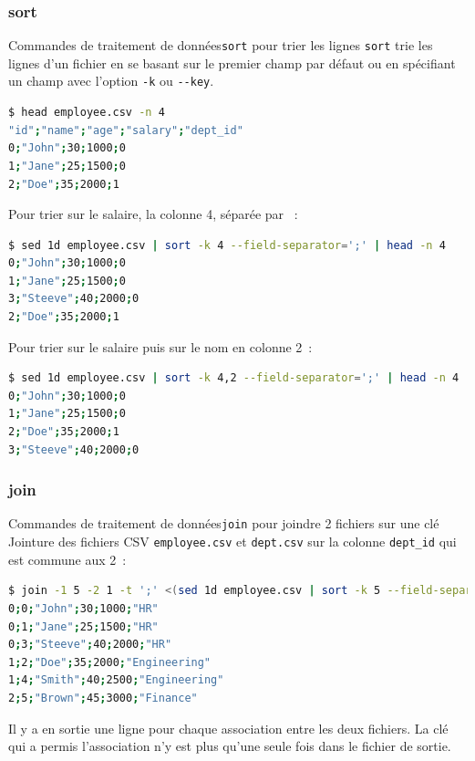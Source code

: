 \documentclass{beamer}
\begin{document}
    \subsubsection{sort}\label{subsubsec:sort}
    \begin{frame}[fragile]{Commandes de traitement de données}{\lstinline{sort} pour trier les lignes}
        \lstinline{sort} trie les lignes d'un fichier en se basant sur le premier champ par défaut ou en spécifiant un champ avec l'option \lstinline{-k} ou \lstinline{--key}.
        \begin{lstlisting}[language=bash,basicstyle=\tiny\ttfamily]
$ head employee.csv -n 4
"id";"name";"age";"salary";"dept_id"
0;"John";30;1000;0
1;"Jane";25;1500;0
2;"Doe";35;2000;1
        \end{lstlisting}
        Pour trier sur le salaire, la colonne 4, séparée par \textquote{;}~:
        \begin{lstlisting}[language=bash,basicstyle=\tiny\ttfamily]
$ sed 1d employee.csv | sort -k 4 --field-separator=';' | head -n 4
0;"John";30;1000;0
1;"Jane";25;1500;0
3;"Steeve";40;2000;0
2;"Doe";35;2000;1
        \end{lstlisting}
        Pour trier sur le salaire puis sur le nom en colonne 2~:
        \begin{lstlisting}[language=bash,basicstyle=\tiny\ttfamily]
$ sed 1d employee.csv | sort -k 4,2 --field-separator=';' | head -n 4
0;"John";30;1000;0
1;"Jane";25;1500;0
2;"Doe";35;2000;1
3;"Steeve";40;2000;0
        \end{lstlisting}
    \end{frame}

    \subsubsection{join}\label{subsubsec:join}
    \begin{frame}[fragile]{Commandes de traitement de données}{\lstinline{join} pour joindre 2 fichiers sur une clé}
        Jointure des fichiers CSV \lstinline{employee.csv} et \lstinline{dept.csv} sur la colonne \lstinline{dept_id} qui est commune aux 2~:
        \begin{lstlisting}[language=bash,basicstyle=\tiny\ttfamily]
$ join -1 5 -2 1 -t ';' <(sed 1d employee.csv | sort -k 5 --field-separator=';') <(sed 1d dept.csv | sort -k 1 --field-separator=';')
0;0;"John";30;1000;"HR"
0;1;"Jane";25;1500;"HR"
0;3;"Steeve";40;2000;"HR"
1;2;"Doe";35;2000;"Engineering"
1;4;"Smith";40;2500;"Engineering"
2;5;"Brown";45;3000;"Finance"
        \end{lstlisting}
        Il y a en sortie une ligne pour chaque association entre les deux fichiers.
        \bigbreak
        La clé qui a permis l'association n'y est plus qu'une seule fois dans le fichier de sortie.
    \end{frame}
\end{document}
